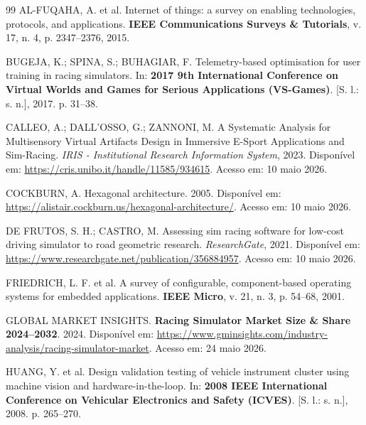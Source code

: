 \documentclass[
  12pt,
  oneside,
  a4paper,
  chapter=TITLE,
  section=TITLE,
  subsection=TITLE,
  brazil
]{abntex2}
\begin{document}
\begin{thebibliography}{99}
AL-FUQAHA, A. et al. Internet of things: a survey on enabling technologies, protocols, and applications. \textbf{IEEE Communications Surveys \& Tutorials}, v. 17, n. 4, p. 2347--2376, 2015.

BUGEJA, K.; SPINA, S.; BUHAGIAR, F. Telemetry-based optimisation for user training in racing simulators. In: \textbf{2017 9th International Conference on Virtual Worlds and Games for Serious Applications (VS-Games)}. [S. l.: s. n.], 2017. p. 31--38.

CALLEO, A.; DALL'OSSO, G.; ZANNONI, M. A Systematic Analysis for Multisensory Virtual Artifacts Design in Immersive E-Sport Applications and Sim-Racing. \textit{IRIS - Institutional Research Information System}, 2023. Disponível em: \url{https://cris.unibo.it/handle/11585/934615}. Acesso em: 10 maio 2026.

COCKBURN, A. Hexagonal architecture. 2005. Disponível em: \url{https://alistair.cockburn.us/hexagonal-architecture/}. Acesso em: 10 maio 2026.

DE FRUTOS, S. H.; CASTRO, M. Assessing sim racing software for low-cost driving simulator to road geometric research. \textit{ResearchGate}, 2021. Disponível em: \url{https://www.researchgate.net/publication/356884957}. Acesso em: 10 maio 2026.

FRIEDRICH, L. F. et al. A survey of configurable, component-based operating systems for embedded applications. \textbf{IEEE Micro}, v. 21, n. 3, p. 54--68, 2001.

GLOBAL MARKET INSIGHTS. \textbf{Racing Simulator Market Size \& Share 2024--2032}. 2024. Disponível em: \url{https://www.gminsights.com/industry-analysis/racing-simulator-market}. Acesso em: 24 maio 2026.

HUANG, Y. et al. Design validation testing of vehicle instrument cluster using machine vision and hardware-in-the-loop. In: \textbf{2008 IEEE International Conference on Vehicular Electronics and Safety (ICVES)}. [S. l.: s. n.], 2008. p. 265--270.


\end{thebibliography}
\end{document}
